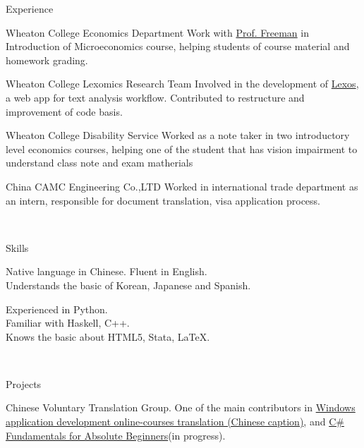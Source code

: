 \documentclass[]{resume-knyte}
\begin{document}
\begin{topic}{Experience}

    
    {Wheaton College Economics Department}
    {Work with \href{https://wheatoncollege.edu/academics/faculty-directory/james-freeman/}{Prof. Freeman}
    in Introduction of Microeconomics course, helping students of course material and homework grading.}
    
    {Wheaton College Lexomics Research Team}
    {Involved in the development of \href{https://github.com/WheatonCS/Lexos}{Lexos}, a web app for text analysis workflow.
    Contributed to restructure and improvement of code basis.}
    
    {Wheaton College Disability Service}
    {Worked as a note taker in two introductory level economics courses, 
    helping one of the student that has vision impairment to understand class note and exam matherials}
    
    {China CAMC Engineering Co.,LTD}
    {Worked in international trade department as an intern, responsible for document translation, visa application process.}

\\ %
\end{topic}


\begin{topic}{Skills}

    {Native language in Chinese. 
    Fluent in English. \\
    Understands the basic of Korean, Japanese and Spanish.}

    {Experienced in Python.\\
    Familiar with Haskell, C++.\\
    Knows the basic about HTML5, Stata, \LaTeX{}.}

    \\ %
\end{topic}

\begin{topic}{Projects}


    {Chinese Voluntary Translation Group.}
    {One of the main contributors in \href{https://channel9.msdn.com/Series/Windows-10-development-for-absolute-beginners}
    {Windows application development online-courses translation (Chinese caption)},
    and \href{https://mva.microsoft.com/en-us/training-courses/c-fundamentals-for-absolute-beginners-16169?l=p90QdGQIC_7106218949}
    {C\# Fundamentals for Absolute Beginners}(in progress).}

\end{topic}
\end{document}
